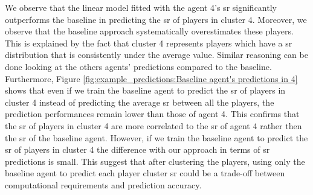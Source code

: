 We observe that the linear model fitted with the agent 4's \acs{sr} significantly outperforms the baseline in predicting the \acs{sr} of players in cluster 4. Moreover, we observe that the baseline approach systematically overestimates these players. This is explained by the fact that cluster 4 represents players which have a \acs{sr} distribution that is consistently under the average value. Similar reasoning can be done looking at the others agents' predictions compared to the baseline. Furthermore, Figure \ref{fig:example_predictions:Baseline agent's predictions in 4} shows that even if we train the baseline agent to predict the \acs{sr} of players in cluster 4 instead of predicting the average \acs{sr} between all the players, the prediction performances remain lower than those of agent 4. This confirms that the \acs{sr} of players in cluster 4 are more correlated to the \acs{sr} of agent 4 rather then the \acs{sr} of the baseline agent. However, if we train the baseline agent to predict the \acs{sr} of players in cluster 4 the difference with our approach in terms of \acs{sr} predictions is small. This suggest that after clustering the players, using only the baseline agent to predict each player cluster \acs{sr} could be a trade-off between computational requirements and prediction accuracy. 


